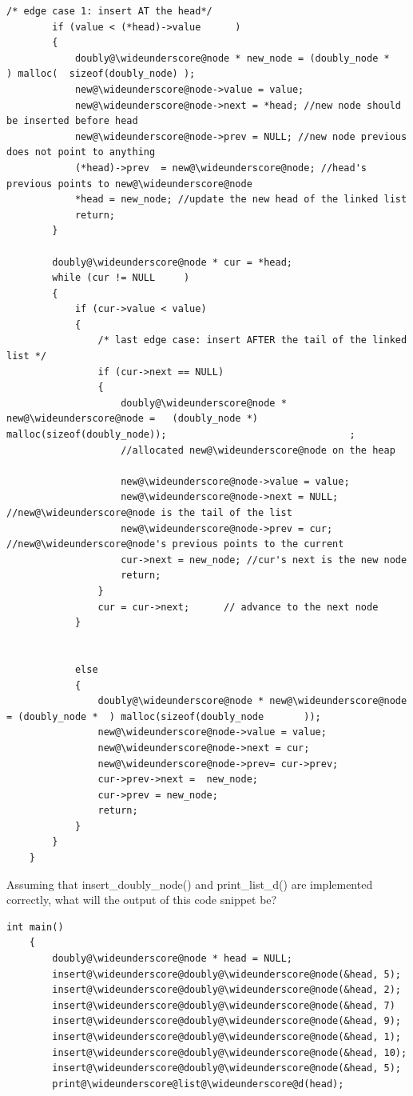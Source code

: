 \documentclass{article}
\begin{document}
\begin{enumerate}[label=(\alph*)]
\begin{lstlisting}[style = CStyle]
        /* edge case 1: insert AT the head*/
        if (value < (*head)->value      )
        {
            doubly@\wideunderscore@node * new_node = (doubly_node *   ) malloc(  sizeof(doubly_node) );
            new@\wideunderscore@node->value = value;
            new@\wideunderscore@node->next = *head; //new node should be inserted before head
            new@\wideunderscore@node->prev = NULL; //new node previous does not point to anything
            (*head)->prev  = new@\wideunderscore@node; //head's previous points to new@\wideunderscore@node
            *head = new_node; //update the new head of the linked list
            return;
        }

        doubly@\wideunderscore@node * cur = *head;
        while (cur != NULL     )
        {
            if (cur->value < value)
            {
                /* last edge case: insert AFTER the tail of the linked list */
                if (cur->next == NULL)
                {
                    doubly@\wideunderscore@node * new@\wideunderscore@node =   (doubly_node *) malloc(sizeof(doubly_node));                                ; 
                    //allocated new@\wideunderscore@node on the heap

                    new@\wideunderscore@node->value = value;
                    new@\wideunderscore@node->next = NULL; //new@\wideunderscore@node is the tail of the list
                    new@\wideunderscore@node->prev = cur; //new@\wideunderscore@node's previous points to the current
                    cur->next = new_node; //cur's next is the new node
                    return;
                }
                cur = cur->next;      // advance to the next node
            }
           

            else 
            {
                doubly@\wideunderscore@node * new@\wideunderscore@node = (doubly_node *  ) malloc(sizeof(doubly_node       ));
                new@\wideunderscore@node->value = value;
                new@\wideunderscore@node->next = cur;
                new@\wideunderscore@node->prev= cur->prev;
                cur->prev->next =  new_node;
                cur->prev = new_node;
                return;
            }
        }
    }
\end{lstlisting}

Assuming that insert\_doubly\_node() and print\_list\_d() are implemented correctly, what will the output of this code snippet be? 

\begin{lstlisting}[style = CStyle]
    int main()
    {
        doubly@\wideunderscore@node * head = NULL;
        insert@\wideunderscore@doubly@\wideunderscore@node(&head, 5);
        insert@\wideunderscore@doubly@\wideunderscore@node(&head, 2);
        insert@\wideunderscore@doubly@\wideunderscore@node(&head, 7)
        insert@\wideunderscore@doubly@\wideunderscore@node(&head, 9);
        insert@\wideunderscore@doubly@\wideunderscore@node(&head, 1);
        insert@\wideunderscore@doubly@\wideunderscore@node(&head, 10);
        insert@\wideunderscore@doubly@\wideunderscore@node(&head, 5);
        print@\wideunderscore@list@\wideunderscore@d(head);


\end{lstlisting}
\end{enumerate}
\end{document}
